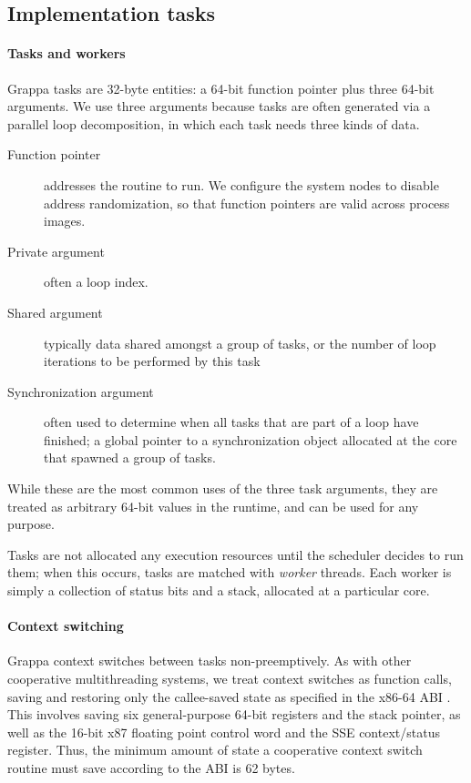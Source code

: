 \subsection{Implementation tasks}

\paragraph{Tasks and workers} Grappa tasks are 32-byte entities: a
64-bit function pointer plus three 64-bit arguments. We use three
arguments because tasks are often generated via a parallel loop
decomposition, in which each task needs three kinds of data.
\begin{description}
\item[Function pointer] addresses the routine to run. We configure the system nodes to disable address randomization, so that function pointers are valid across process images.
\item[Private argument] often a loop index.
\item[Shared argument] typically data shared amongst a group of tasks, or the number of loop iterations to be performed by this task
\item[Synchronization argument] often used to determine
  when all tasks that are part of a loop have finished; a global pointer to a synchronization object allocated at the core that spawned a group of tasks.
\end{description}
While these are the most common uses of the three task arguments, they
are treated as arbitrary 64-bit values in the runtime, and can be used
for any purpose.

Tasks are not allocated any execution resources until the scheduler
decides to run them; when this occurs, tasks are matched with {\em
  worker} threads. Each worker is simply a collection of status bits and a
stack, allocated at a particular core.

\paragraph{Context switching} Grappa context switches between tasks
non-preemptively. As with other cooperative multithreading systems, we
treat context switches as function calls, saving and restoring only the
callee-saved state as specified in the x86-64 ABI \cite{amd64:abi:2012}. This
involves saving six general-purpose 64-bit registers and the stack
pointer, as well as the 16-bit x87 floating point control word and the
SSE context/status register. Thus, the minimum amount of state a
cooperative context switch routine must save according to the ABI is 62
bytes.


